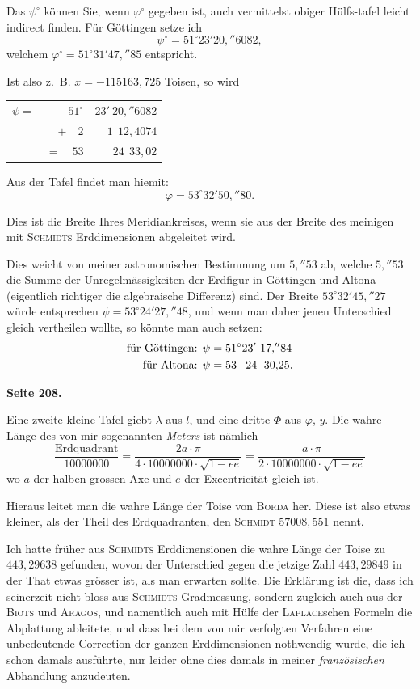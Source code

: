 \documentclass[12pt,a4paper]{article}
\theoremstyle{plain}
\theoremstyle{definition}
\theoremstyle{remark}
\begin{document}
Das $\psi^{\circ}$ können Sie, wenn $\varphi^{\circ}$ gegeben ist, auch vermittelst obiger Hülfs-\-tafel leicht indirect finden. Für Göttingen setze ich
\[
\psi^{\circ} = 51^{\circ} 23' 20{,}''6082,
\]
welchem $\varphi^{\circ} = 51^{\circ} 31' 47{,}''85$ entspricht.

Ist also z.~B. $x = -115163{,}725$ Toisen, so wird
\begin{center}
\begin{tabular}{r@{\ }r@{\ }r}
$\psi =$ & $51^{\circ}$ & $23'\ 20{,}''6082$ \\
& $+\quad 2$ & $1\ \ 12{,}4074$ \\
\hline
& $=\quad 53$ & $24\ \ 33{,}02$
\end{tabular}
\end{center}

Aus der Tafel findet man hiemit:
\[
\varphi = 53^{\circ} 32' 50{,}''80.
\]

Dies ist die Breite Ihres Meridiankreises, wenn sie aus der Breite des meinigen mit \textsc{Schmidts} Erddimensionen abgeleitet wird.

Dies weicht von meiner astronomischen Bestimmung um $5{,}''53$ ab, welche $5{,}''53$ die Summe der Unregelmässigkeiten der Erdfigur in Göttingen und Altona (eigentlich richtiger die algebraische Differenz) sind. Der Breite $53^{\circ} 32' 45{,}''27$ würde entsprechen $\psi = 53^{\circ} 24' 27{,}''48$, und wenn man daher jenen Unterschied gleich vertheilen wollte, so könnte man auch setzen:
\begin{align*}
\text{für Göttingen: } \psi &= 51^{\circ} 23'\ 17{,}''84 \\
\text{für Altona: } \psi &= 53\hphantom{^{\circ}}\ 24\hphantom{'}\ 30{,}25.
\end{align*}

\newpage
\textbf{Seite 208.}

Eine zweite kleine Tafel giebt $\lambda$ aus $l$, und eine dritte $\Phi$ aus $\varphi$, $y$. Die wahre Länge des von mir sogenannten \emph{Meters} ist nämlich
\[
\frac{\text{Erdquadrant}}{10000000} = \frac{2a \cdot \pi}{4 \cdot 10000000 \cdot \sqrt{1 - ee}} = \frac{a \cdot \pi}{2 \cdot 10000000 \cdot \sqrt{1 - ee}}
\]
wo $a$ der halben grossen Axe und $e$ der Excentricität gleich ist.

Hieraus leitet man die wahre Länge der Toise von \textsc{Borda} her. Diese ist also etwas kleiner, als der Theil des Erdquadranten, den \textsc{Schmidt} $57008{,}551$ nennt.

Ich hatte früher aus \textsc{Schmidts} Erddimensionen die wahre Länge der Toise zu $443{,}29638$ gefunden, wovon der Unterschied gegen die jetzige Zahl $443{,}29849$ in der That etwas grösser ist, als man erwarten sollte. Die Erklärung ist die, dass ich seinerzeit nicht bloss aus \textsc{Schmidts} Gradmessung, sondern zugleich auch aus der \textsc{Biots} und \textsc{Aragos}, und namentlich auch mit Hülfe der \textsc{Laplace}schen Formeln die Abplattung ableitete, und dass bei dem von mir verfolgten Verfahren eine unbedeutende Correction der ganzen Erddimensionen nothwendig wurde, die ich schon damals ausführte, nur leider ohne dies damals in meiner \emph{französischen} Abhandlung anzudeuten.
\end{document}
